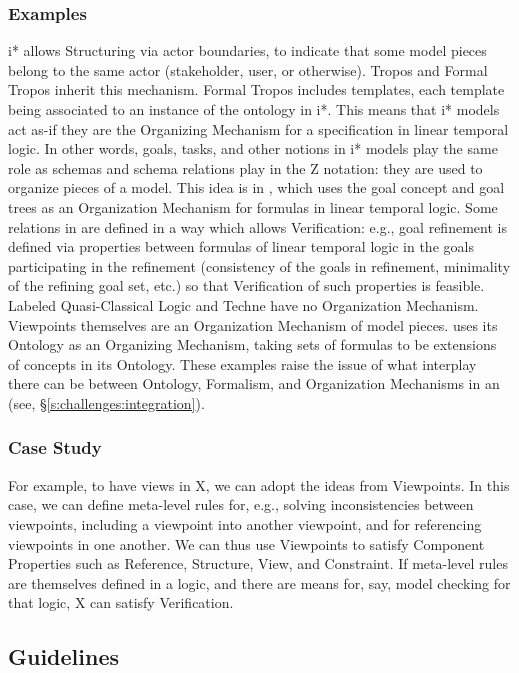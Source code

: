 \documentclass[10pt, final, conference, compsocconf]{IEEEtran}
\begin{document}
\subsubsection{Examples}
i* allows Structuring via actor boundaries, to indicate that some model pieces belong to the same actor (stakeholder, user, or otherwise). Tropos and Formal Tropos inherit this mechanism. Formal Tropos includes templates, each template being associated to an instance of the ontology in i*. This means that i* models act as-if they are the Organizing Mechanism for a specification in linear temporal logic. In other words, goals, tasks, and other notions in i* models play the same role as schemas and schema relations play in the Z notation: they are used to organize pieces of a model. This idea is in , which uses the goal concept and goal trees as an Organization Mechanism for formulas in linear temporal logic. Some relations in  are defined in a way which allows Verification: e.g., goal refinement is defined via properties between formulas of linear temporal logic in the goals participating in the refinement (consistency of the goals in refinement, minimality of the refining goal set, etc.) so that Verification of such properties is feasible. Labeled Quasi-Classical Logic and Techne have no Organization Mechanism. Viewpoints themselves are an Organization Mechanism of model pieces.  uses its Ontology as an Organizing Mechanism, taking sets of formulas to be extensions of concepts in its Ontology. These examples raise the issue of what interplay there can be between Ontology, Formalism, and Organization Mechanisms in an  (see, \S\ref{s:challenges:integration}).

\subsubsection{Case Study}
For example, to have views in X, we can adopt the ideas from Viewpoints. In this case, we can define meta-level rules for, e.g., solving inconsistencies between viewpoints, including a viewpoint into another viewpoint, and for referencing viewpoints in one another. We can thus use Viewpoints to satisfy Component Properties such as Reference, Structure, View, and Constraint. If meta-level rules are themselves defined in a logic, and there are means for, say, model checking for that logic, X can satisfy Verification.


\subsection{Guidelines}\label{s:components:guidelines}
\end{document}
